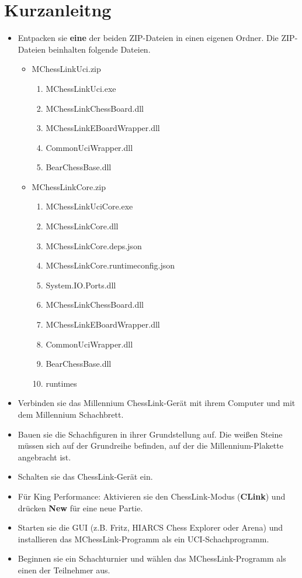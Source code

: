 \documentclass[11pt,a4paper]{article}
\begin{document}
\section{Kurzanleitng}
\begin{itemize}
	\item Entpacken sie \textbf{eine} der beiden ZIP-Dateien in einen eigenen Ordner. Die ZIP-Dateien beinhalten folgende Dateien.
    \begin{itemize}
		\item MChessLinkUci.zip
      	\begin{enumerate}
  		 	\item MChessLinkUci.exe
			\item MChessLinkChessBoard.dll
			\item MChessLinkEBoardWrapper.dll
			\item CommonUciWrapper.dll
			\item BearChessBase.dll
		\end{enumerate}
	    \item MChessLinkCore.zip
		   \begin{enumerate}
			   	\item MChessLinkUciCore.exe
				\item MChessLinkCore.dll
				\item MChessLinkCore.deps.json
				\item MChessLinkCore.runtimeconfig.json
				\item System.IO.Ports.dll
    			\item MChessLinkChessBoard.dll
                \item MChessLinkEBoardWrapper.dll
                \item CommonUciWrapper.dll
                \item BearChessBase.dll
				\item runtimes
		   \end{enumerate}
    \end{itemize}
	\item Verbinden sie das Millennium ChessLink-Gerät mit ihrem Computer und mit dem Millennium Schachbrett.
	\item Bauen sie die Schachfiguren in ihrer Grundstellung auf. Die weißen Steine müssen sich auf der Grundreihe befinden, auf der die Millennium-Plakette angebracht ist.
	\item Schalten sie das ChessLink-Gerät ein.
	\item Für King Performance: Aktivieren sie den ChessLink-Modus (\textbf{CLink}) und drücken \textbf{New} für eine neue Partie.
	\item Starten sie die GUI (z.B. Fritz, HIARCS Chess Explorer oder Arena) und installieren das MChessLink-Programm als ein UCI-Schachprogramm.
	\item Beginnen sie ein Schachturnier und wählen das MChessLink-Programm als einen der Teilnehmer aus.
\end{itemize}
\end{document}
